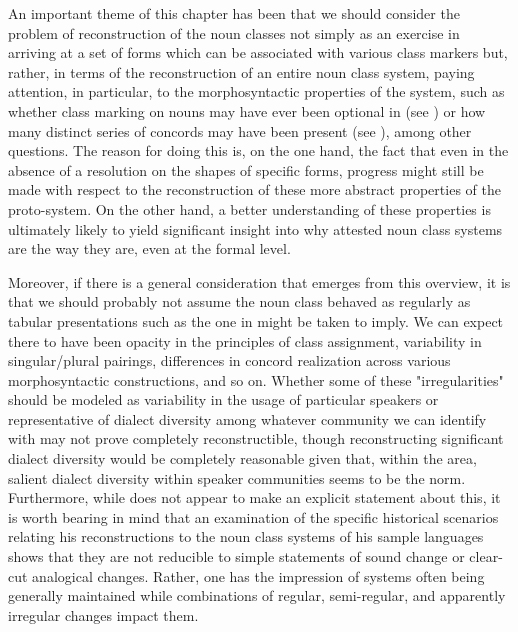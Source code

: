 \documentclass[output=paper ,collection	  ,collectionchapter ,biblatexbackend=biber   ]{langscibook}
\begin{document}
An important theme of this chapter has been that we should consider the problem
of reconstruction of the  noun classes not simply as an
exercise in arriving at a set of forms which can be associated with various
class markers but, rather, in terms of the reconstruction of an entire noun
class system, paying attention, in particular, to the morphosyntactic properties
of the system, such as whether class marking on nouns may have ever been optional
in  (see ) or how many distinct series of
concords may have been present (see ), among other questions.
The reason for doing this is, on the one hand, the fact that even in the absence
of a resolution on the shapes of specific forms, progress might still be made
with respect to the reconstruction of these more abstract properties of the
proto-system. On the other hand,  a better understanding of these properties is
ultimately likely to yield significant insight into why attested 
noun class systems are the way they are, even at the formal level.

Moreover, if there is a general consideration that emerges from this overview,
it is that we should probably not assume the  noun class
behaved as regularly as tabular presentations such as the one in
 might be taken to imply. We can expect there to have been
opacity in the principles of class assignment, variability in singular/plural
pairings, differences in concord realization across various morphosyntactic
constructions, and so on. Whether some of these "irregularities" should be modeled as variability in the usage
of particular speakers or representative of dialect diversity among whatever
community we can identify with  may not prove completely
reconstructible, though reconstructing significant dialect diversity would be
completely reasonable given that, within the  area, salient
dialect diversity within speaker communities seems to be the norm. Furthermore,
while  does not appear to make an explicit statement about
this, it is worth bearing in mind that an examination of the specific historical
scenarios relating his  reconstructions to the noun class
systems of his sample languages shows that they are not reducible to simple
statements of sound change or clear-cut analogical changes. Rather, one has the
impression of systems often being generally maintained while combinations of
regular, semi-regular, and apparently irregular changes impact them.
\end{document}
